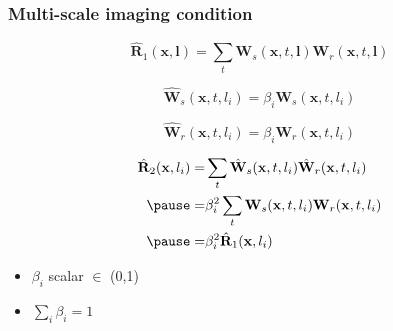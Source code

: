 \begin{frame} \frametitle{Multi-scale imaging condition}

\begin{equation} \label{eqn:cic}
\hat{\mathbf{R}}_1(\mathbf{x},\mathbf{l})=\sum_t {\mathbf{W}_s(\mathbf{x},t,\mathbf{l})\mathbf{W}_r(\mathbf{x},t,\mathbf{l})}
\end{equation}

\pause

\begin{equation} \label{eqn:ws_hat}
\hat{\mathbf{W}}_s(\mathbf{x},t,l_i)=\beta_i\mathbf{W}_s(\mathbf{x},t,l_i)
\end{equation}

\pause

\begin{equation} \label{eqn:wr_hat}
\hat{\mathbf{W}}_r(\mathbf{x},t,l_i)=\beta_i\mathbf{W}_r(\mathbf{x},t,l_i)
\end{equation}

\pause

\begin{equation} \label{eqn:cic_level_s}
\begin{aligned}
\hat{\mathbf{R}}_2(\mathbf{x},l_i)
=&\sum_t {\hat{\mathbf{W}}_s(\mathbf{x},t,l_i)\hat{\mathbf{W}}_r(\mathbf{x},t,l_i)}\\
\pause
=&\beta_i^2\sum_t {\mathbf{W}_s(\mathbf{x},t,l_i)\mathbf{W}_r(\mathbf{x},t,l_i)}\\
\pause
=&\beta_i^2       \hat{\mathbf{R}}_1(\mathbf{x},l_i) 
\end{aligned}
\end{equation}

\pause

\centering
\begin{itemize}
\item $\beta_i$ scalar $\in$ (0,1) 
\item $\sum_i\beta_i=1$ 
\end{itemize}

\end{frame}

